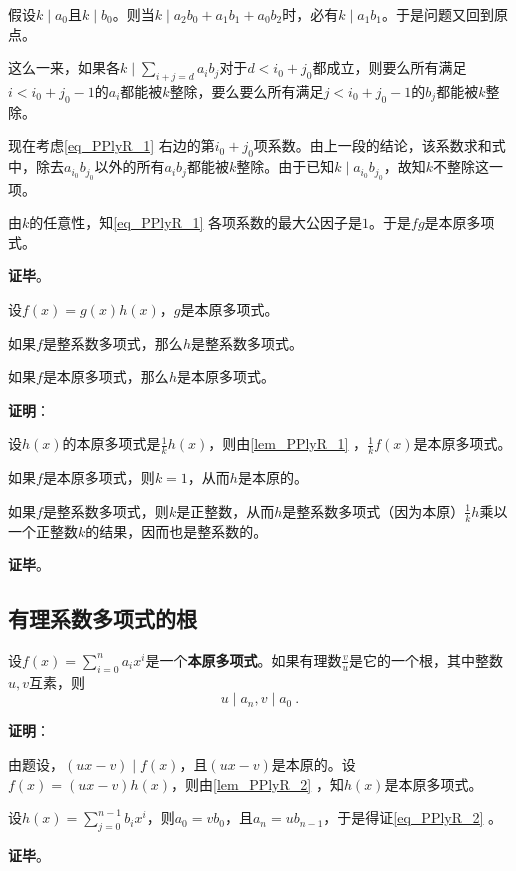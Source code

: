 假设$k\mid a_0$且$k\mid b_0$。则当$k\mid a_2b_0+a_1b_1+a_0b_2$时，必有$k\mid a_1b_1$。于是问题又回到原点。

这么一来，如果各$k\mid\sum_{i+j=d}a_ib_j$对于$d<i_0+j_0$都成立，则要么所有满足$i<i_0+j_0-1$的$a_i$都能被$k$整除，要么要么所有满足$j<i_0+j_0-1$的$b_j$都能被$k$整除。

现在考虑\autoref{eq_PPlyR_1} 右边的第$i_0+j_0$项系数。由上一段的结论，该系数求和式中，除去$a_{i_0}b_{j_0}$以外的所有$a_ib_j$都能被$k$整除。由于已知$k\mid a_{i_0}b_{j_0}$，故知$k$不整除这一项。

由$k$的任意性，知\autoref{eq_PPlyR_1} 各项系数的最大公因子是$1$。于是$fg$是本原多项式。



\textbf{证毕}。



\begin{lemma}{}\label{lem_PPlyR_2}
设$f(x)=g(x)h(x)$，$g$是本原多项式。

如果$f$是整系数多项式，那么$h$是整系数多项式。

如果$f$是本原多项式，那么$h$是本原多项式。
\end{lemma}

\textbf{证明}：

设$h(x)$的本原多项式是$\frac{1}{k}h(x)$，则由\autoref{lem_PPlyR_1} ，$\frac{1}{k}f(x)$是本原多项式。

如果$f$是本原多项式，则$k=1$，从而$h$是本原的。

如果$f$是整系数多项式，则$k$是正整数，从而$h$是整系数多项式（因为本原）$\frac{1}{k}h$乘以一个正整数$k$的结果，因而也是整系数的。



\textbf{证毕}。




\subsection{有理系数多项式的根}

\begin{theorem}{}
设$f(x)=\sum_{i=0}^n a_ix^i$是一个\textbf{本原多项式}。如果有理数$\frac{v}{u}$是它的一个根，其中整数$u, v$互素，则
\begin{equation}\label{eq_PPlyR_2}
u\mid a_n, v\mid a_0~.
\end{equation}
\end{theorem}

\textbf{证明}：

由题设，$(ux-v)\mid f(x)$，且$(ux-v)$是本原的。设$f(x)=(ux-v)h(x)$，则由\autoref{lem_PPlyR_2} ，知$h(x)$是本原多项式。

设$h(x)=\sum_{j=0}^{n-1} b_ix^i$，则$a_0=vb_0$，且$a_n=ub_{n-1}$，于是得证\autoref{eq_PPlyR_2} 。

\textbf{证毕}。















